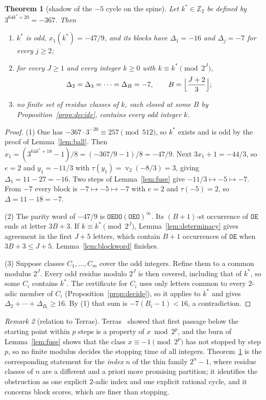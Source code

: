 \documentclass[11pt]{article}
\newtheorem{theorem}{Theorem}[section]
\theoremstyle{definition}
\theoremstyle{remark}
\newtheorem{remark}[theorem]{Remark}
\newcommand{\Z}{\mathbb{Z}}
\DeclareMathOperator{\vv}{v}
\begin{document}
\begin{theorem}[shadow of the $-5$ cycle on the spine]\label{thm:F}
Let $k^{*}\in\Z_2$ be defined by $3^{64k^{*}+20}=-367$. Then
\begin{enumerate}
\item $k^{*}$ is odd, $x_1(k^{*})=-47/9$, and its blocks have
  $\Delta_1=-16$ and $\Delta_j=-7$ for every $j\ge2$;
\item for every $J\ge1$ and every integer $k\ge0$ with
  $k\equiv k^{*}\pmod{2^{J}}$,
  \[
  \Delta_2=\Delta_3=\cdots=\Delta_{B}=-7,
  \qquad B=\Bigl\lfloor\frac{J+2}{3}\Bigr\rfloor;
  \]
\item no finite set of residue classes of $k$, each closed at some $B$
  by Proposition~\ref{prop:decide}, contains every odd integer $k$.
\end{enumerate}
\end{theorem}

\begin{proof}
(1) One has $-367\cdot3^{-20}\equiv257\pmod{512}$, so $k^{*}$ exists
and is odd by the proof of Lemma~\ref{lem:ball}. Then
$x_1=(3^{64k^{*}+18}-1)/8=(-367/9-1)/8=-47/9$. Next
$3x_1+1=-44/3$, so $e=2$ and $y_1=-11/3$ with
$\tau(y_1)=\vv_2(-8/3)=3$, giving $\Delta_1=11-27=-16$. Two steps of
Lemma~\ref{lem:fuse} give $-11/3\mapsto-5\mapsto-7$. From $-7$ every
block is $-7\mapsto-5\mapsto-7$ with $e=2$ and $\tau(-5)=2$, so
$\Delta=11-18=-7$.

(2) The parity word of $-47/9$ is
$\mathtt{OEOO}(\mathtt{OEO})^{\infty}$. Its $(B+1)$-st occurrence of
$\mathtt{OE}$ ends at letter $3B+3$. If $k\equiv k^{*}\pmod{2^{J}}$,
Lemma~\ref{lem:determinacy} gives agreement in the first $J+5$ letters,
which contain $B+1$ occurrences of $\mathtt{OE}$ when $3B+3\le J+5$.
Lemma~\ref{lem:blockword} finishes.

(3) Suppose classes $C_1,\dots,C_m$ cover the odd integers. Refine them
to a common modulus $2^{J}$. Every odd residue modulo $2^{J}$ is then
covered, including that of $k^{*}$, so some $C_i$ contains $k^{*}$. The
certificate for $C_i$ uses only letters common to every $2$-adic member
of $C_i$ (Proposition~\ref{prop:decide}), so it applies to $k^{*}$ and
gives $\Delta_2+\cdots+\Delta_{B_i}\ge16$. By (1) that sum is
$-7(B_i-1)<16$, a contradiction.
\end{proof}

\begin{remark}[relation to Terras]\label{rem:terras}
Terras~\cite{Terras1976} showed that first passage below the starting
point within $p$ steps is a property of $x\bmod2^{p}$, and the burn of
Lemma~\ref{lem:fuse} shows that the class $x\equiv-1\pmod{2^{p}}$ has
not stopped by step $p$, so no finite modulus decides the stopping time
of all integers. Theorem~\ref{thm:F} is the corresponding statement for
the \emph{index} $n$ of the thin family $2^{n}-1$, where residue classes
of $n$ are a different and a priori more promising partition; it
identifies the obstruction as one explicit $2$-adic index and one
explicit rational cycle, and it concerns block scores, which are finer
than stopping.
\end{remark}
\end{document}

